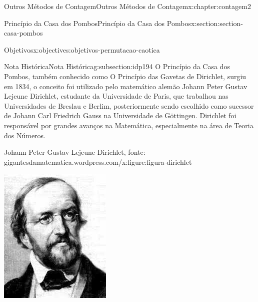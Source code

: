 \documentclass[oneside,10pt,]{book}
\numberwithin{equation}{section}
\begin{document}
\begin{chapterptx}{Outros Métodos de Contagem}{}{Outros Métodos de Contagem}{}{}{x:chapter:contagem2}
\begin{sectionptx}{Princípio da Casa dos Pombos}{}{Princípio da Casa dos Pombos}{}{}{x:section:section-casa-pombos}
\begin{objectives}{Objetivos}{x:objectives:objetivos-permutacao-caotica}
\begin{enumerate}
\end{enumerate}
\end{objectives}
%
%
\typeout{************************************************}
\typeout{************************************************}
%
\begin{subsectionptx}{Nota Histórica}{}{Nota Histórica}{}{}{g:subsection:idp194}
O Princípio da Casa dos Pombos, também conhecido como O Princípio das Gavetas de Dirichlet, surgiu em 1834, o conceito foi utilizado pelo matemático alemão Johann Peter Gustav Lejeune Dirichlet, estudante da Universidade de Paris, que trabalhou nas Universidades de Breslau e Berlim, posteriormente sendo escolhido como sucessor de Johann Carl Friedrich Gauss na Universidade de Göttingen. Dirichlet foi responsável por grandes avanços na Matemática, especialmente na área de Teoria dos Números.%
\begin{figureptx}{Johann Peter Gustav Lejeune Dirichlet, fonte: gigantesdamatematica.wordpress.com\slash{}}{x:figure:figura-dirichlet}{}%
\begin{image}{0.35}{0.3}{0.35}%
\includegraphics[width=\linewidth]{images/Dirichlet.jpg}

\end{image}
\end{figureptx}
\end{subsectionptx}
\end{sectionptx}
\end{chapterptx}
\end{document}
